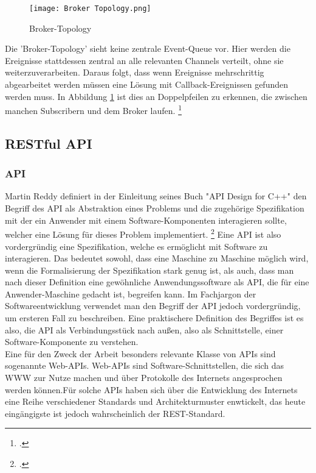\begin{figure}[H]
  \centering
  \texttt{[image: Broker Topology.png]}
  \caption[Broker-Topology]{Broker-Topology \footnotemark}
  \label{brokertop}
\end{figure}
Die 'Broker-Topology' sieht keine zentrale Event-Queue vor. Hier werden die Ereignisse stattdessen zentral an alle relevanten Channels verteilt, ohne sie weiterzuverarbeiten. Daraus folgt, dass wenn Ereignisse mehrschrittig abgearbeitet werden müssen eine Lösung mit Callback-Ereignissen gefunden werden muss. In Abbildung \ref{brokertop} ist dies an Doppelpfeilen zu erkennen, die zwischen manchen Subscribern und dem Broker laufen. \footcite[Vgl. ][]{wickramarachchi_2017_event}

\subsection{RESTful API}
\subsubsection*{API}
Martin Reddy definiert in der Einleitung seines Buch "API Design for C++" den Begriff des \ac{API} als Abstraktion eines Problems und die zugehörige Spezifikation mit der ein Anwender mit einem Software-Komponenten interagieren sollte, welcher eine Lösung für dieses Problem implementiert. \footcite[Vgl. ][S. 1]{reddy2011api} Eine API ist also vordergründig eine Spezifikation, welche es ermöglicht mit Software zu interagieren. Das bedeutet sowohl, dass eine Maschine zu Maschine möglich wird, wenn die Formalisierung der Spezifikation stark genug ist, als auch, dass man nach dieser Definition eine gewöhnliche Anwendungssoftware als API, die für eine Anwender-Maschine gedacht ist, begreifen kann. Im Fachjargon der Softwareentwicklung verwendet man den Begriff der \ac{API} jedoch vordergründig, um ersteren Fall zu beschreiben. Eine praktischere Definition des Begriffes ist es also, die API als Verbindungsstück nach außen, also als Schnittstelle, einer Software-Komponente zu verstehen. \\
Eine für den Zweck der Arbeit besonders relevante Klasse von \ac{API}s sind sogenannte Web-\ac{API}s. Web-\ac{API}s sind Software-Schnittstellen, die sich das \ac{WWW} zur Nutze machen und über Protokolle des Internets angesprochen werden können.\citepls Für solche \ac{API}s haben sich über die Entwicklung des Internets eine Reihe verschiedener Standards und Architekturmuster enwtickelt, das heute eingängigste ist jedoch wahrscheinlich der REST-Standard. \citepls
